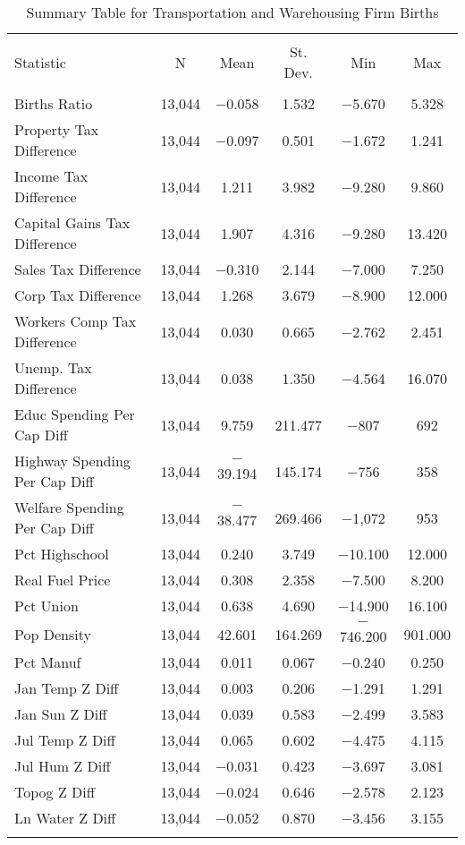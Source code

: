 
\begin{table}[!htbp] \centering 
  \caption{Summary Table for  Transportation and Warehousing Firm Births} 
  \label{48-49summary} 
\begin{tabular}{@{\extracolsep{5pt}}lccccc} 
\\[-1.8ex]\hline 
\hline \\[-1.8ex] 
Statistic & \multicolumn{1}{c}{N} & \multicolumn{1}{c}{Mean} & \multicolumn{1}{c}{St. Dev.} & \multicolumn{1}{c}{Min} & \multicolumn{1}{c}{Max} \\ 
\hline \\[-1.8ex] 
Births Ratio & 13,044 & $-$0.058 & 1.532 & $-$5.670 & 5.328 \\ 
Property Tax Difference & 13,044 & $-$0.097 & 0.501 & $-$1.672 & 1.241 \\ 
Income Tax Difference & 13,044 & 1.211 & 3.982 & $-$9.280 & 9.860 \\ 
Capital Gains Tax Difference & 13,044 & 1.907 & 4.316 & $-$9.280 & 13.420 \\ 
Sales Tax Difference & 13,044 & $-$0.310 & 2.144 & $-$7.000 & 7.250 \\ 
Corp Tax Difference & 13,044 & 1.268 & 3.679 & $-$8.900 & 12.000 \\ 
Workers Comp Tax Difference & 13,044 & 0.030 & 0.665 & $-$2.762 & 2.451 \\ 
Unemp. Tax Difference & 13,044 & 0.038 & 1.350 & $-$4.564 & 16.070 \\ 
Educ Spending Per Cap Diff & 13,044 & 9.759 & 211.477 & $-$807 & 692 \\ 
Highway Spending Per Cap Diff & 13,044 & $-$39.194 & 145.174 & $-$756 & 358 \\ 
Welfare Spending Per Cap Diff & 13,044 & $-$38.477 & 269.466 & $-$1,072 & 953 \\ 
Pct Highschool & 13,044 & 0.240 & 3.749 & $-$10.100 & 12.000 \\ 
Real Fuel Price & 13,044 & 0.308 & 2.358 & $-$7.500 & 8.200 \\ 
Pct Union & 13,044 & 0.638 & 4.690 & $-$14.900 & 16.100 \\ 
Pop Density & 13,044 & 42.601 & 164.269 & $-$746.200 & 901.000 \\ 
Pct Manuf & 13,044 & 0.011 & 0.067 & $-$0.240 & 0.250 \\ 
Jan Temp Z Diff & 13,044 & 0.003 & 0.206 & $-$1.291 & 1.291 \\ 
Jan Sun Z Diff & 13,044 & 0.039 & 0.583 & $-$2.499 & 3.583 \\ 
Jul Temp Z Diff & 13,044 & 0.065 & 0.602 & $-$4.475 & 4.115 \\ 
Jul Hum Z Diff & 13,044 & $-$0.031 & 0.423 & $-$3.697 & 3.081 \\ 
Topog Z Diff & 13,044 & $-$0.024 & 0.646 & $-$2.578 & 2.123 \\ 
Ln Water Z Diff & 13,044 & $-$0.052 & 0.870 & $-$3.456 & 3.155 \\ 
\hline \\[-1.8ex] 
\end{tabular} 
\end{table} 
